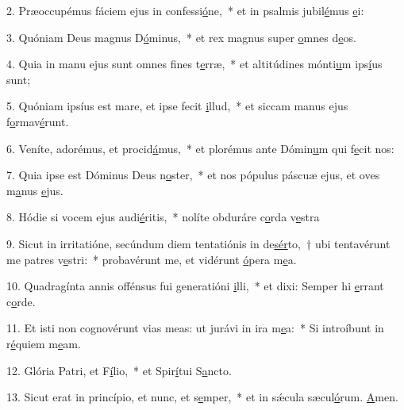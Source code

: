 2. Præoccupémus fáciem ejus in confessi\uline{ó}ne,~* et in psalmis jubil\uline{é}mus \uline{e}i:\par 
3. Quóniam Deus magnus D\uline{ó}minus,~* et rex magnus super \uline{o}mnes d\uline{e}os.\par 
4. Quia in manu ejus sunt omnes fines t\uline{e}rræ,~* et altitúdines mónti\uline{u}m ips\uline{í}us sunt;\par 
5. Quóniam ipsíus est mare, et ipse fecit \uline{i}llud,~* et siccam manus ejus f\uline{o}rmav\uline{é}runt.\par 
6. Veníte, adorémus, et procid\uline{á}mus,~* et plorémus ante Dómin\uline{u}m qui f\uline{e}cit nos:\par 
7. Quia ipse est Dóminus Deus n\uline{o}ster,~* et nos pópulus páscuæ ejus, et oves m\uline{a}nus \uline{e}jus.\par 
8. Hódie si vocem ejus audi\uline{é}ritis,~* nolíte obduráre c\uline{o}rda v\uline{e}stra\par 
9. Sicut in irritatióne, secúndum diem tentatiónis in de\uline{sér}to,~† ubi tentavérunt me patres v\uline{e}stri:~* probavérunt me, et vidérunt \uline{ó}pera m\uline{e}a.\par 
10. Quadragínta annis offénsus fui generatióni \uline{i}lli,~* et dixi: Semper hi \uline{e}rrant c\uline{o}rde.\par 
11. Et isti non cognovérunt vias meas: ut jurávi in ira m\uline{e}a:~* Si introíbunt in r\uline{é}quiem m\uline{e}am.\par 
12. Glória Patri, et F\uline{í}lio,~* et Spir\uline{í}tui S\uline{a}ncto.\par 
13. Sicut erat in princípio, et nunc, et s\uline{e}mper,~* et in sǽcula sæcul\uline{ó}rum. \uline{A}men.\par 
